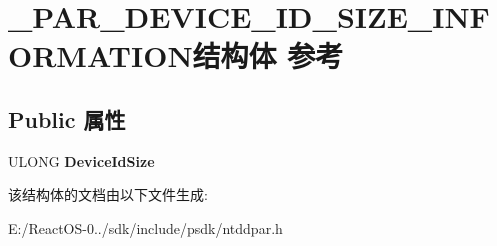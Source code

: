 \hypertarget{struct___p_a_r___d_e_v_i_c_e___i_d___s_i_z_e___i_n_f_o_r_m_a_t_i_o_n}{}\section{\+\_\+\+P\+A\+R\+\_\+\+D\+E\+V\+I\+C\+E\+\_\+\+I\+D\+\_\+\+S\+I\+Z\+E\+\_\+\+I\+N\+F\+O\+R\+M\+A\+T\+I\+O\+N结构体 参考}
\label{struct___p_a_r___d_e_v_i_c_e___i_d___s_i_z_e___i_n_f_o_r_m_a_t_i_o_n}
\subsection*{Public 属性}
\begin{DoxyCompactItemize}
\item 
\mbox{\label{struct___p_a_r___d_e_v_i_c_e___i_d___s_i_z_e___i_n_f_o_r_m_a_t_i_o_n_a9e95df01ac665a1ded767b72d7041cd6}} 
U\+L\+O\+NG {\bfseries Device\+Id\+Size}
\end{DoxyCompactItemize}


该结构体的文档由以下文件生成\+:\begin{DoxyCompactItemize}
\item 
E\+:/\+React\+O\+S-\/0../sdk/include/psdk/ntddpar.\+h\end{DoxyCompactItemize}
